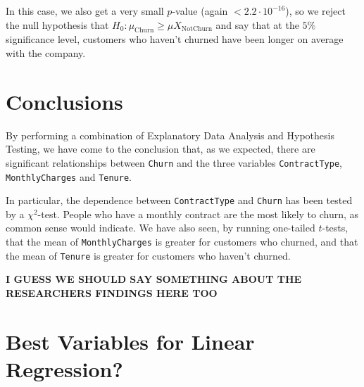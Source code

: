 \documentclass[man, floatsintext]{apa6}
\begin{document}
\hspace{0.5mm}

In this case, we also get a very small $p$-value (again $< 2.2 \cdot 10^{-16}$), so we reject the null hypothesis that  $H_0: \mu_{\text{Churn}} \geq \mu{X}_{\text{NotChurn}}$ and say that at the $5 \%$ significance level, customers who haven't churned have been longer on average with the company. 


\section{Conclusions}

By performing a combination of Explanatory Data Analysis and Hypothesis Testing, we have come to the conclusion that, as we expected, there are significant relationships between \texttt{Churn} and the three variables \texttt{ContractType}, \texttt{MonthlyCharges} and \texttt{Tenure}. 

In particular, the dependence between \texttt{ContractType} and \texttt{Churn} has been tested by a $\chi^2$-test. People who have a monthly contract are the most likely to churn, as common sense would indicate. We have also seen, by running one-tailed $t$-tests, that the mean of \texttt{MonthlyCharges} is greater for customers who churned, and that the mean of \texttt{Tenure} is greater for customers who haven't churned. 

\textbf{I GUESS WE SHOULD SAY SOMETHING ABOUT THE RESEARCHERS FINDINGS HERE TOO}

\appendix
\section{Best Variables for Linear Regression?}
\newpage
\printbibliography
\end{document}
